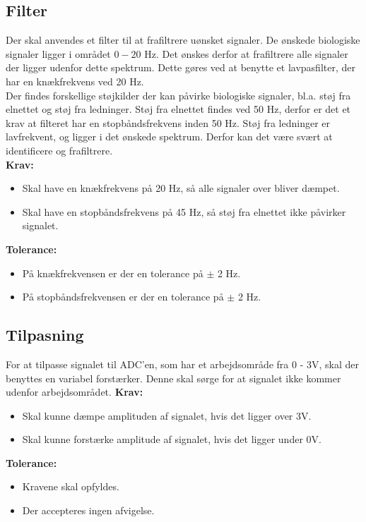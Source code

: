 \subsection{Filter}
Der skal anvendes et filter til at frafiltrere uønsket signaler. De ønskede biologiske signaler ligger i området $0 - 20$ Hz. Det ønskes derfor at frafiltrere alle signaler der ligger udenfor dette spektrum. Dette gøres ved at benytte et lavpasfilter, der har en knækfrekvens ved 20 Hz. \\
Der findes forskellige støjkilder der kan påvirke biologiske signaler, bl.a. støj fra elnettet og støj fra ledninger. Støj fra elnettet findes ved 50 Hz, derfor er det et krav at filteret har en stopbåndsfrekvens inden 50 Hz. Støj fra ledninger er lavfrekvent, og ligger i det ønskede spektrum. Derfor kan det være svært at identificere og frafiltrere. \\
\textbf{Krav:}
\begin{itemize}
\item Skal have en knækfrekvens på 20 Hz, så alle signaler over bliver dæmpet.
\item Skal have en stopbåndsfrekvens på 45 Hz, så støj fra elnettet ikke påvirker signalet.
\end{itemize}
\textbf{Tolerance:}
\begin{itemize}
\item På knækfrekvensen er der en tolerance på $\pm$ 2 Hz.
\item På stopbåndsfrekvensen er der en tolerance på $\pm$ 2 Hz.
\end{itemize}
\subsection{Tilpasning}
For at tilpasse signalet til ADC'en, som har et arbejdsområde fra 0 - 3V, skal der benyttes en variabel forstærker. Denne skal sørge for at signalet ikke kommer udenfor arbejdsområdet.
\textbf{Krav:}
\begin{itemize}
\item Skal kunne dæmpe amplituden af signalet, hvis det ligger over 3V.
\item Skal kunne forstærke amplitude af signalet, hvis det ligger under 0V.
\end{itemize}
\textbf{Tolerance:}
\begin{itemize}
\item Kravene skal opfyldes.
\item Der accepteres ingen afvigelse.
\end{itemize}
